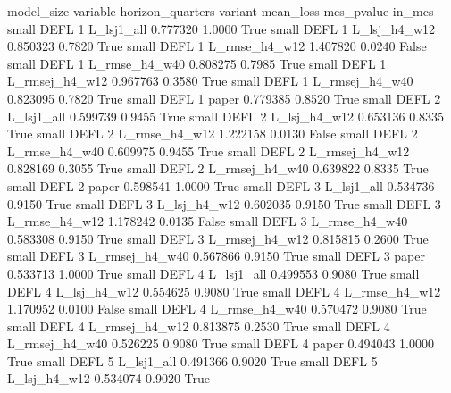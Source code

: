 model_size variable  horizon_quarters        variant  mean_loss  mcs_pvalue  in_mcs
     small     DEFL                 1     L_lsj1_all   0.777320      1.0000    True
     small     DEFL                 1   L_lsj_h4_w12   0.850323      0.7820    True
     small     DEFL                 1  L_rmse_h4_w12   1.407820      0.0240   False
     small     DEFL                 1  L_rmse_h4_w40   0.808275      0.7985    True
     small     DEFL                 1 L_rmsej_h4_w12   0.967763      0.3580    True
     small     DEFL                 1 L_rmsej_h4_w40   0.823095      0.7820    True
     small     DEFL                 1          paper   0.779385      0.8520    True
     small     DEFL                 2     L_lsj1_all   0.599739      0.9455    True
     small     DEFL                 2   L_lsj_h4_w12   0.653136      0.8335    True
     small     DEFL                 2  L_rmse_h4_w12   1.222158      0.0130   False
     small     DEFL                 2  L_rmse_h4_w40   0.609975      0.9455    True
     small     DEFL                 2 L_rmsej_h4_w12   0.828169      0.3055    True
     small     DEFL                 2 L_rmsej_h4_w40   0.639822      0.8335    True
     small     DEFL                 2          paper   0.598541      1.0000    True
     small     DEFL                 3     L_lsj1_all   0.534736      0.9150    True
     small     DEFL                 3   L_lsj_h4_w12   0.602035      0.9150    True
     small     DEFL                 3  L_rmse_h4_w12   1.178242      0.0135   False
     small     DEFL                 3  L_rmse_h4_w40   0.583308      0.9150    True
     small     DEFL                 3 L_rmsej_h4_w12   0.815815      0.2600    True
     small     DEFL                 3 L_rmsej_h4_w40   0.567866      0.9150    True
     small     DEFL                 3          paper   0.533713      1.0000    True
     small     DEFL                 4     L_lsj1_all   0.499553      0.9080    True
     small     DEFL                 4   L_lsj_h4_w12   0.554625      0.9080    True
     small     DEFL                 4  L_rmse_h4_w12   1.170952      0.0100   False
     small     DEFL                 4  L_rmse_h4_w40   0.570472      0.9080    True
     small     DEFL                 4 L_rmsej_h4_w12   0.813875      0.2530    True
     small     DEFL                 4 L_rmsej_h4_w40   0.526225      0.9080    True
     small     DEFL                 4          paper   0.494043      1.0000    True
     small     DEFL                 5     L_lsj1_all   0.491366      0.9020    True
     small     DEFL                 5   L_lsj_h4_w12   0.534074      0.9020    True
